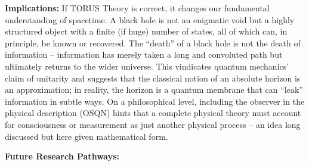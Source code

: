 \documentclass[]{article}
\begin{document}
\textbf{Implications:} If TORUS Theory is correct, it changes our
fundamental understanding of spacetime. A black hole is not an enigmatic
void but a highly structured object with a finite (if huge) number of
states, all of which can, in principle, be known or recovered. The
``death'' of a black hole is not the death of information -- information
has merely taken a long and convoluted path but ultimately returns to
the wider universe. This vindicates quantum mechanics' claim of
unitarity and suggests that the classical notion of an absolute horizon
is an approximation; in reality, the horizon is a quantum membrane that
can ``leak'' information in subtle ways. On a philosophical level,
including the observer in the physical description (OSQN) hints that a
complete physical theory must account for consciousness or measurement
as just another physical process -- an idea long discussed but here
given mathematical form.

\textbf{Future Research Pathways:}
\end{document}
